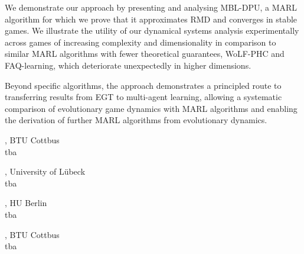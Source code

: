 \documentclass[12pt,a4paper]{article}
\begin{document}
 We demonstrate our approach by presenting and analysing MBL-DPU, a MARL algorithm for which we prove that it approximates RMD and converges in stable games. We illustrate the utility of our dynamical systems analysis experimentally across games of increasing complexity and dimensionality in comparison to similar MARL algorithms with fewer theoretical guarantees, WoLF-PHC and FAQ-learning, which deteriorate unexpectedly in higher dimensions. 

 Beyond specific algorithms, the approach demonstrates a principled route to transferring results from EGT to multi-agent learning, allowing a systematic comparison of evolutionary game dynamics with MARL algorithms and enabling the derivation of further MARL algorithms from evolutionary dynamics. 

\bigskip\bigskip

, BTU Cottbus \\[2ex] tba 

\bigskip\bigskip

, University of Lübeck \\[2ex] tba 

\bigskip\bigskip

, HU Berlin \\[2ex] tba 

\bigskip\bigskip

, BTU Cottbus \\[2ex] tba 

\bigskip\bigskip
\end{document}
